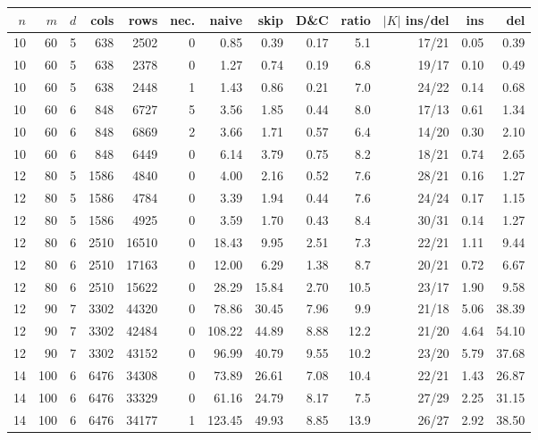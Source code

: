 \documentclass[11pt]{article}
\theoremstyle{definition}
\begin{document}
{\small
\begin{center}
\begin{tabular}{rrrrrr|rrrr|rrr}
$n$&$m$&$d$&cols&rows&nec.&naive&skip&D\&C&ratio&$|K|$ ins/del&ins&del\\\hline
10 & 60 & 5 & 638 & 2502 & 0 & 0.85 & 0.39 & 0.17 & 5.1 & 17/21 & 0.05 & 0.39 \\
10 & 60 & 5 & 638 & 2378 & 0 & 1.27 & 0.74 & 0.19 & 6.8 & 19/17 & 0.10 & 0.49 \\
10 & 60 & 5 & 638 & 2448 & 1 & 1.43 & 0.86 & 0.21 & 7.0 & 24/22 & 0.14 & 0.68 \\
10 & 60 & 6 & 848 & 6727 & 5 & 3.56 & 1.85 & 0.44 & 8.0 & 17/13 & 0.61 & 1.34 \\
10 & 60 & 6 & 848 & 6869 & 2 & 3.66 & 1.71 & 0.57 & 6.4 & 14/20 & 0.30 & 2.10 \\
10 & 60 & 6 & 848 & 6449 & 0 & 6.14 & 3.79 & 0.75 & 8.2 & 18/21 & 0.74 & 2.65 \\
12 & 80 & 5 & 1586 & 4840 & 0 & 4.00 & 2.16 & 0.52 & 7.6 & 28/21 & 0.16 & 1.27 \\
12 & 80 & 5 & 1586 & 4784 & 0 & 3.39 & 1.94 & 0.44 & 7.6 & 24/24 & 0.17 & 1.15 \\
12 & 80 & 5 & 1586 & 4925 & 0 & 3.59 & 1.70 & 0.43 & 8.4 & 30/31 & 0.14 & 1.27 \\
12 & 80 & 6 & 2510 & 16510 & 0 & 18.43 & 9.95 & 2.51 & 7.3 & 22/21 & 1.11 & 9.44 \\
12 & 80 & 6 & 2510 & 17163 & 0 & 12.00 & 6.29 & 1.38 & 8.7 & 20/21 & 0.72 & 6.67 \\
12 & 80 & 6 & 2510 & 15622 & 0 & 28.29 & 15.84 & 2.70 & 10.5 & 23/17 & 1.90 & 9.58 \\
12 & 90 & 7 & 3302 & 44320 & 0 & 78.86 & 30.45 & 7.96 & 9.9 & 21/18 & 5.06 & 38.39 \\
12 & 90 & 7 & 3302 & 42484 & 0 & 108.22 & 44.89 & 8.88 & 12.2 & 21/20 & 4.64 & 54.10 \\
12 & 90 & 7 & 3302 & 43152 & 0 & 96.99 & 40.79 & 9.55 & 10.2 & 23/20 & 5.79 & 37.68 \\
14 & 100 & 6 & 6476 & 34308 & 0 & 73.89 & 26.61 & 7.08 & 10.4 & 22/21 & 1.43 & 26.87 \\
14 & 100 & 6 & 6476 & 33329 & 0 & 61.16 & 24.79 & 8.17 & 7.5 & 27/29 & 2.25 & 31.15 \\
14 & 100 & 6 & 6476 & 34177 & 1 & 123.45 & 49.93 & 8.85 & 13.9 & 26/27 & 2.92 & 38.50 \\
\end{tabular}
\end{center}}
\end{document}
